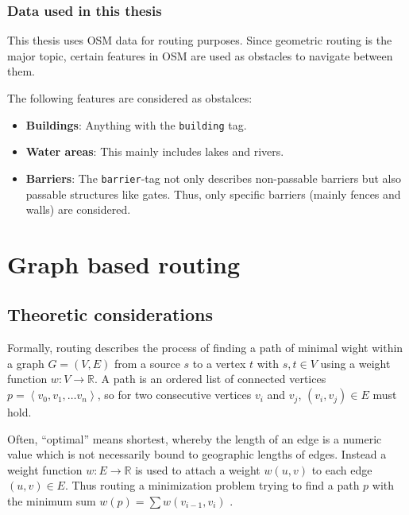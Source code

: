 		\subsubsection{Data used in this thesis}
		
			This thesis uses OSM data for routing purposes.
			Since geometric routing is the major topic, certain features in OSM are used as obstacles to navigate between them.
			
			The following features are considered as obstalces:
			\begin{itemize}
				\item \textbf{Buildings}: Anything with the \texttt{building} tag.
				\item \textbf{Water areas}: This mainly includes lakes and rivers.
				\item \textbf{Barriers}: The \texttt{barrier}-tag not only describes non-passable barriers but also passable structures like gates. Thus, only specific barriers (mainly fences and walls) are considered.
			\end{itemize}

\section{Graph based routing}
\label{sec:graph-routing}

	\subsection{Theoretic considerations}
	\label{subsec:routing-theoretic-considerations}	
	
		Formally, routing describes the process of finding a path of minimal wight within a graph $G=(V, E)$ from a source $s$ to a vertex $t$ with $s, t \in V$ using a weight function $w: V \rightarrow \mathbb{R}$.
		A path is an ordered list of connected vertices $p=\left\langle v_0, v_1, \dots v_n \right\rangle$, so for two consecutive vertices $v_i$ and $v_j$, $(v_i, v_j) \in E$ must hold.
		
		Often, \enquote{optimal} means shortest, whereby the length of an edge is a numeric value which is not necessarily bound to geographic lengths of edges.
		Instead a weight function $w : E \rightarrow \mathbb{R}$ is used to attach a weight $w(u, v)$ to each edge $(u, v) \in E$.
		Thus routing a minimization problem trying to find a path $p$ with the minimum sum $w(p) = \sum{w(v_{i-1}, v_i)}$ \cite[645]{cormen-introduction-to-alg}.
		
